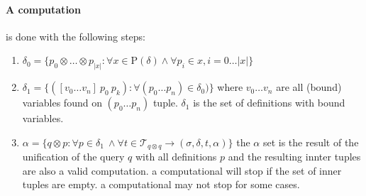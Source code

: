 \documentclass[11pt,a4paper]{report}
\newcommand{\unify}{\otimes}
\begin{document}
\paragraph{A computation} is done with the following steps:

\begin{enumerate}
    \item $\delta_{0} = \{ p_{0} \unify \ldots \unify p_{|x|} : \forall x \in \mathrm{P}(\delta) \wedge \forall p_{i} \in x, i=0 \ldots |x| \}$
    \item $\delta_{1} = \{ ([v_{0} \ldots v_{n}]\ p_{0}\ p_{k}): \forall (p_{0} \ldots p_{n}) \in \delta_{0})\}$
    \subitem where $v_{0} \ldots v_{n}$ are all (bound) variables found on $(p_{0} \ldots p_{n})$ tuple.
    \subitem $\delta_{1}$ is the set of definitions with bound variables.
    \item $\alpha = \{q \unify p :\forall p \in \delta_{1}\ \wedge \forall t \in \mathcal{T}_{q \unify q} \rightarrow (\sigma, \delta, t, \alpha) \}$
    \subitem the $\alpha$ set is the result of the unification of the query $q$ with all definitions $p$ and the resulting innter tuples are
    also a valid computation.
    \subitem a computational will stop if the set of inner tuples are empty.
    \subitem a computational may not stop for some cases.
\end{enumerate}
\end{document}
